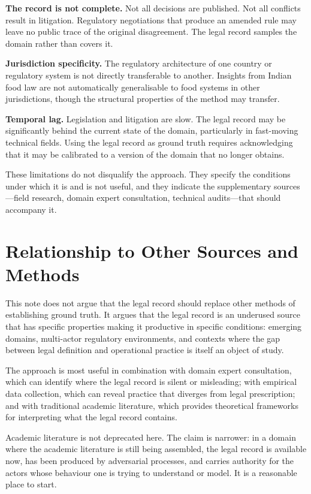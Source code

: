 \documentclass[12pt,a4paper]{article}
\begin{document}
\textbf{The record is not complete.} Not all decisions are published. Not all
conflicts result in litigation. Regulatory negotiations that produce an amended
rule may leave no public trace of the original disagreement. The legal record
samples the domain rather than covers it.

\textbf{Jurisdiction specificity.} The regulatory architecture of one country or
regulatory system is not directly transferable to another. Insights from Indian
food law are not automatically generalisable to food systems in other jurisdictions,
though the structural properties of the method may transfer.

\textbf{Temporal lag.} Legislation and litigation are slow. The legal record may be
significantly behind the current state of the domain, particularly in fast-moving
technical fields. Using the legal record as ground truth requires acknowledging that
it may be calibrated to a version of the domain that no longer obtains.

These limitations do not disqualify the approach. They specify the conditions under
which it is and is not useful, and they indicate the supplementary sources---field
research, domain expert consultation, technical audits---that should accompany it.

\section{Relationship to Other Sources and Methods}

This note does not argue that the legal record should replace other methods of
establishing ground truth. It argues that the legal record is an underused source
that has specific properties making it productive in specific conditions: emerging
domains, multi-actor regulatory environments, and contexts where the gap between
legal definition and operational practice is itself an object of study.

The approach is most useful in combination with domain expert consultation, which
can identify where the legal record is silent or misleading; with empirical data
collection, which can reveal practice that diverges from legal prescription; and
with traditional academic literature, which provides theoretical frameworks for
interpreting what the legal record contains.

Academic literature is not deprecated here. The claim is narrower: in a domain
where the academic literature is still being assembled, the legal record is
available now, has been produced by adversarial processes, and carries authority
for the actors whose behaviour one is trying to understand or model. It is a
reasonable place to start.
\end{document}
